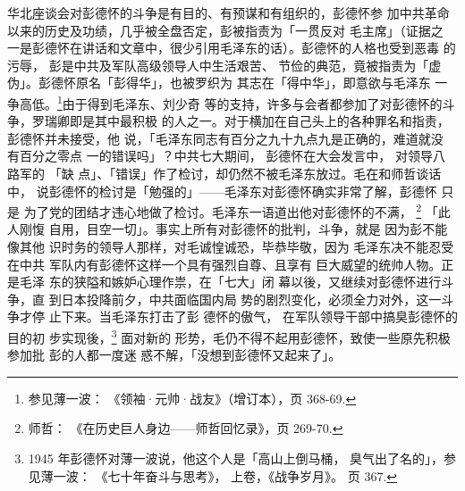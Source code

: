 华北座谈会对彭德怀的斗争是有目的、有预谋和有组织的，彭德怀参 加中共革命
以来的历史及功绩，几乎被全盘否定，彭被指责为「一贯反对 毛主席」（证据之
一是彭德怀在讲话和文章中，很少引用毛泽东的话）。彭德怀的人格也受到恶毒
的污辱， 彭是中共及军队高级领导人中生活艰苦、 节俭的典范，竟被指责为「虚
伪」。彭德怀原名「彭得华」，也被罗织为 其志在「得中华」，即意欲与毛泽东
一争高低。\footnote{参见薄一波： 《领袖·元帅·战友》（增订本），页
368-69.}由于得到毛泽东、刘少奇 等的支持，许多与会者都参加了对彭德怀的斗
争，罗瑞卿即是其中最积极 的人之一。对于横加在自己头上的各种罪名和指责，
彭德怀并未接受，他 说，「毛泽东同志有百分之九十九点九是正确的，难道就没
有百分之零点 一的错误吗」？中共七大期间， 彭德怀在大会发言中， 对领导八
路军的 「缺 点」、「错误」作了检讨，却仍然不被毛泽东放过。毛在和师哲谈话
中， 说彭德怀的检讨是「勉强的」——毛泽东对彭德怀确实非常了解，彭德怀 只是
为了党的团结才违心地做了检讨。毛泽东一语道出他对彭德怀的不满，
\footnote{师哲： 《在历史巨人身边——师哲回忆录》，页 269-70.} 「此人刚愎
自用，目空一切」。事实上所有对彭德怀的批判，斗争，就是 因为彭不能像其他
识时务的领导人那样，对毛诚惶诚恐，毕恭毕敬，因为 毛泽东决不能忍受在中共
军队内有彭德怀这样一个具有强烈自尊、且享有 巨大威望的统帅人物。正是毛泽
东的狭隘和嫉妒心理作祟，在「七大」闭 幕以後，又继续对彭德怀进行斗争，直
到日本投降前夕，中共面临国内局 势的剧烈变化，必须全力对外，这一斗争才停
止下来。当毛泽东打击了彭 德怀的傲气， 在军队领导干部中搞臭彭德怀的目的初
步实现後，\footnote{1945 年彭德怀对薄一波说，他这个人是「高山上倒马桶，
臭气出了名的」，参见薄一波： 《七十年奋斗与思考》， 上卷，《战争岁月》。
页 367.  } 面对新的 形势，毛仍不得不起用彭德怀，致使一些原先积极参加批
彭的人都一度迷 惑不解，「没想到彭德怀又起来了」。

